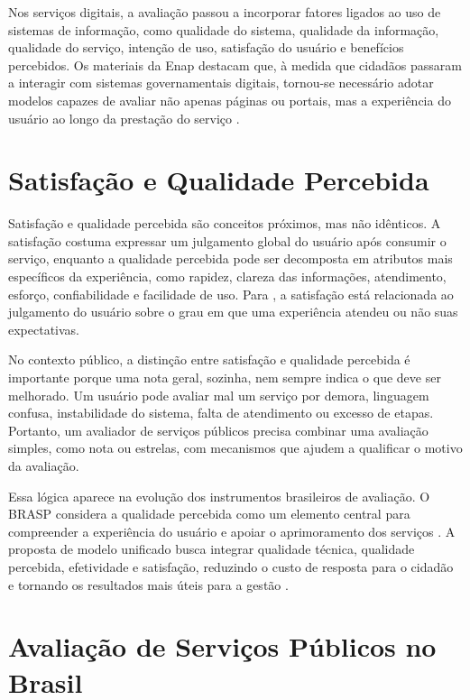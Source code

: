 Nos serviços digitais, a avaliação passou a incorporar fatores ligados ao uso de
sistemas de informação, como qualidade do sistema, qualidade da informação,
qualidade do serviço, intenção de uso, satisfação do usuário e benefícios
percebidos. Os materiais da Enap destacam que, à medida que cidadãos passaram a
interagir com sistemas governamentais digitais, tornou-se necessário adotar
modelos capazes de avaliar não apenas páginas ou portais, mas a experiência do
usuário ao longo da prestação do serviço
\cite{limaPereira2020modulo2,deloneMclean2003,pedrosa2019qualidadeGovbr}.

\section{Satisfação e Qualidade Percebida}

Satisfação e qualidade percebida são conceitos próximos, mas não idênticos. A
satisfação costuma expressar um julgamento global do usuário após consumir o
serviço, enquanto a qualidade percebida pode ser decomposta em atributos mais
específicos da experiência, como rapidez, clareza das informações, atendimento,
esforço, confiabilidade e facilidade de uso. Para ,
a satisfação está relacionada ao julgamento do usuário sobre o grau em que uma
experiência atendeu ou não suas expectativas.

No contexto público, a distinção entre satisfação e qualidade percebida é
importante porque uma nota geral, sozinha, nem sempre indica o que deve ser
melhorado. Um usuário pode avaliar mal um serviço por demora, linguagem confusa,
instabilidade do sistema, falta de atendimento ou excesso de etapas. Portanto,
um avaliador de serviços públicos precisa combinar uma avaliação simples, como
nota ou estrelas, com mecanismos que ajudem a qualificar o motivo da avaliação.

Essa lógica aparece na evolução dos instrumentos brasileiros de avaliação. O
BRASP considera a qualidade percebida como um elemento central para compreender
a experiência do usuário e apoiar o aprimoramento dos serviços
\cite{silva2019brasp}. A proposta de modelo unificado busca integrar qualidade
técnica, qualidade percebida, efetividade e satisfação, reduzindo o custo de
resposta para o cidadão e tornando os resultados mais úteis para a gestão
\cite{silva2022modeloUnificado}.

\section{Avaliação de Serviços Públicos no Brasil}

